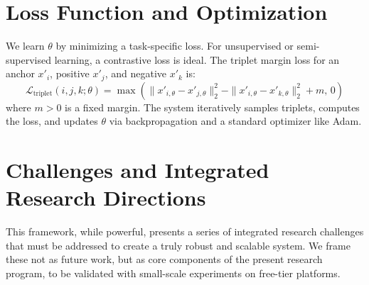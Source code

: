 \documentclass[11pt, letterpaper]{article}
\begin{document}
\section{Loss Function and Optimization}
We learn $\theta$ by minimizing a task-specific loss. For unsupervised or semi-supervised learning, a contrastive loss is ideal. The triplet margin loss for an anchor $x'_i$, positive $x'_j$, and negative $x'_k$ is:
\begin{equation}
    \mathcal{L}_{\text{triplet}}(i, j, k; \theta) = \max \left( \|x'_{i,\theta} - x'_{j,\theta}\|_2^2 - \|x'_{i,\theta} - x'_{k,\theta}\|_2^2 + m, \, 0 \right)
\end{equation}
where $m > 0$ is a fixed margin. The system iteratively samples triplets, computes the loss, and updates $\theta$ via backpropagation and a standard optimizer like Adam.

\section{Challenges and Integrated Research Directions}
This framework, while powerful, presents a series of integrated research challenges that must be addressed to create a truly robust and scalable system. We frame these not as future work, but as core components of the present research program, to be validated with small-scale experiments on free-tier platforms.
\end{document}
